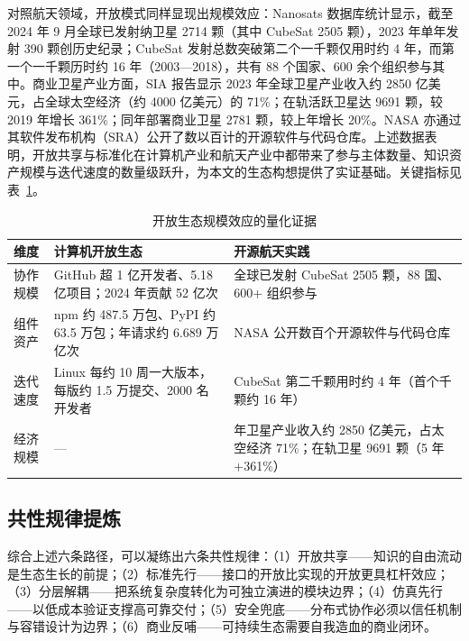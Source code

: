 \documentclass[UTF8,a4paper,zihao=-4]{ctexart}
\begin{document}
对照航天领域，开放模式同样显现出规模效应：Nanosats 数据库统计显示，截至 2024 年 9 月全球已发射纳卫星 2714 颗（其中 CubeSat 2505 颗），2023 年单年发射 390 颗创历史纪录；CubeSat 发射总数突破第二个一千颗仅用时约 4 年，而第一个一千颗历时约 16 年（2003—2018），共有 88 个国家、600 余个组织参与其中\cite{kulu2024}。商业卫星产业方面，SIA 报告显示 2023 年全球卫星产业收入约 2850 亿美元，占全球太空经济（约 4000 亿美元）的 71\%；在轨活跃卫星达 9691 颗，较 2019 年增长 361\%；同年部署商业卫星 2781 颗，较上年增长 20\%\cite{sia2024}。NASA 亦通过其软件发布机构（SRA）公开了数以百计的开源软件与代码仓库\cite{nasa}。上述数据表明，开放共享与标准化在计算机产业和航天产业中都带来了参与主体数量、知识资产规模与迭代速度的数量级跃升，为本文的生态构想提供了实证基础。关键指标见表~\ref{tab:data}。

\begin{table}[htbp]
\centering
\footnotesize
\caption{开放生态规模效应的量化证据}
\label{tab:data}
\begin{tabularx}{\textwidth}{@{}>{\raggedright\arraybackslash}p{1.6cm}>{\raggedright\arraybackslash}X>{\raggedright\arraybackslash}X@{}}
\toprule
维度 & 计算机开放生态 & 开源航天实践 \\
\midrule
协作规模 & GitHub 超 1 亿开发者、5.18 亿项目；2024 年贡献 52 亿次\cite{octoverse2024} & 全球已发射 CubeSat 2505 颗，88 国、600+ 组织参与\cite{kulu2024} \\
组件资产 & npm 约 487.5 万包、PyPI 约 63.5 万包；年请求约 6.689 万亿次\cite{sonatype2024} & NASA 公开数百个开源软件与代码仓库\cite{nasa} \\
迭代速度 & Linux 每约 10 周一大版本，每版约 1.5 万提交、2000 名开发者\cite{lwn2023} & CubeSat 第二千颗用时约 4 年（首个千颗约 16 年）\cite{kulu2024} \\
经济规模 & --- & 2023 年卫星产业收入约 2850 亿美元，占太空经济 71\%；在轨卫星 9691 颗（5 年 +361\%）\cite{sia2024} \\
\bottomrule
\end{tabularx}
\end{table}

\subsection{共性规律提炼}
综合上述六条路径，可以凝练出六条共性规律：（1）开放共享——知识的自由流动是生态生长的前提；（2）标准先行——接口的开放比实现的开放更具杠杆效应；（3）分层解耦——把系统复杂度转化为可独立演进的模块边界；（4）仿真先行——以低成本验证支撑高可靠交付；（5）安全兜底——分布式协作必须以信任机制与容错设计为边界；（6）商业反哺——可持续生态需要自我造血的商业闭环。
\end{document}
